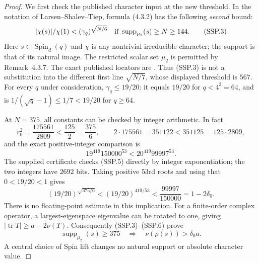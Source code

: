 \begin{proof}
We first check the published character input at the new threshold.
In the notation of Larsen--Shalev--Tiep, formula (4.3.2) has
the following \emph{second} bound:
\[
 |\chi(s)|/\chi(1)<(\gamma_q)^{\sqrt{N/6}}
        \quad\hbox{if }\operatorname{supp}_{\mu_2}(s)\ge N\ge144.
 \tag{SSP.3}
\]
Here $s\in\operatorname{Spin}_d(q)$ and $\chi$ is any nontrivial
irreducible character; the support is that of its natural image.
The restricted scalar set $\mu_2$ is permitted by Remark~4.3.7.
The exact published locators are
\cite[(4.1.1), p.~1907; Theorem~4.3.6, (4.3.2), p.~1918;
complete proof pp.~1918--1923; Remark~4.3.7, p.~1923]{HOS:LST2011}.
Thus (SSP.3) is not a substitution into the different first
line $\sqrt{N/7}$, whose displayed threshold is $567$.
For every $q$ under consideration, $\gamma_q\le19/20$:
it equals $19/20$ for $q<4^3=64$, and is
$1/(\sqrt q-1)\le1/7<19/20$ for $q\ge64$.

At $N=375$, all constants can be checked by integer arithmetic.
In fact
\[
 r_0^2=\frac{175561}{2809}<\frac{125}{2}=\frac{375}{6},
 \qquad 2\cdot175561=351122<351125=125\cdot2809,
 \tag{SSP.4}
\]
and the exact positive-integer comparison is
\[
                  19^{419}150000^{53}
                    <20^{419}99997^{53}.                    \tag{SSP.5}
\]
The supplied certificate checks (SSP.5) directly by integer
exponentiation; the two integers have $2692$ bits.
Taking positive $53$rd roots and using that $0<19/20<1$ gives
\[
 (19/20)^{\sqrt{375/6}}
       <(19/20)^{419/53}
       <\frac{99997}{150000}=1-2\delta_0.
 \tag{SSP.6}
\]
There is no floating-point estimate in this implication.
For a finite-order complex operator, a largest-eigenspace
eigenvalue can be rotated to one, giving
$|\operatorname{tr}T|\ge a-2\nu(T)$.
Consequently (SSP.3)--(SSP.6) prove
\[
 \operatorname{supp}_{\mu_2}(s)\ge375
            \quad\Longrightarrow\quad\nu(\rho(s))>\delta_0a.
 \tag{SSP.7}
\]
A central choice of Spin lift changes no natural support
or absolute character value.


\end{proof}
